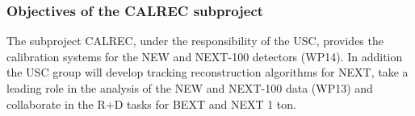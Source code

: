 %
%

\subsubsection*{Objectives of the CALREC subproject}

The subproject CALREC, under the responsibility of the USC, provides the calibration systems for the NEW and NEXT-100 detectors (WP14).
In addition the USC group will develop tracking reconstruction algorithms for NEXT, 
take a leading role in the analysis of the NEW and NEXT-100 data (WP13) and collaborate  in the R+D tasks for BEXT and NEXT 1 ton. 


